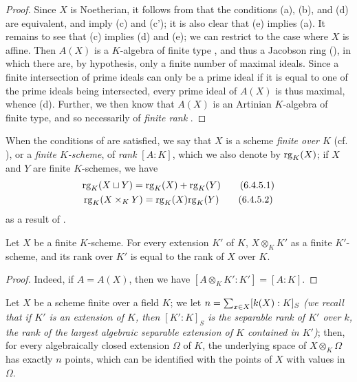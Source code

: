 \begin{proof}
\label{proof-1.6.4.4}
Since $X$ is Noetherian, it follows from  that the conditions (a), (b), and (d) are equivalent, and imply (c) and (c');
it is also clear that (e) implies (a).
It remains to see that (c) implies (d) and (e);
we can restrict to the case where $X$ is affine.
Then $A(X)$ is a $K$-algebra of finite type , and thus a Jacobson ring (\cite[p.~3-11 and 3-12]{I-1}), in which there are, by hypothesis, only a finite number of maximal ideals.
Since a finite intersection of prime ideals can only be a prime ideal if it is equal to one of the prime ideals being intersected, every prime ideal of $A(X)$ is thus maximal, whence (d).
Further, we then know  that $A(X)$ is an Artinian $K$-algebra of finite type, and so necessarily of \emph{finite rank} \cite{I-21}.
\end{proof}

\begin{env}[6.4.5]
\label{1.6.4.5}
When the conditions of  are satisfied, we say that $X$ is a scheme \emph{finite over $K$} (cf. ), or a \emph{finite $K$-scheme}, of \emph{rank} $[A:K]$, which we also denote by ${\mathop{\mathrm{rg}}}_K(X)$;
if $X$ and $Y$ are finite $K$-schemes, we have
\begin{gather*}
{\mathop{\mathrm{rg}}}_K(X\sqcup Y)={\mathop{\mathrm{rg}}}_K(X)+{\mathop{\mathrm{rg}}}_K(Y)\tag{6.4.5.1}\\
{\mathop{\mathrm{rg}}}_K(X\times_K Y)={\mathop{\mathrm{rg}}}_K(X){\mathop{\mathrm{rg}}}_K(Y)\tag{6.4.5.2}
\end{gather*}
as a result of .
\end{env}

\begin{cor}[6.4.6]
\label{1.6.4.6}
Let $X$ be a finite $K$-scheme.
For every extension $K'$ of $K$, $X\otimes_K K'$ as a finite $K'$-scheme, and its rank over $K'$ is equal to the rank of $X$ over $K$.
\end{cor}

\begin{proof}
\label{proof-1.6.4.6}
Indeed, if $A=A(X)$, then we have $[A\otimes_K K':K']=[A:K]$.
\end{proof}

\begin{cor}[6.4.7]
\label{1.6.4.7}
Let $X$ be a scheme finite over a field $K$;
we let $n=\sum_{x\in X}[k(X):K]_S$ \emph{(we recall that if $K'$ is an extension of $K$, then $[K':K]_S$ is the \emph{separable rank} of $K'$ over $k$, the rank of the largest algebraic separable extension of $K$ contained in $K'$)};
then, for every algebraically closed extension $\Omega$ of $K$, the underlying space of $X\otimes_K\Omega$ has exactly $n$ points, which can be identified with the points of $X$ with values in $\Omega$.
\end{cor}

